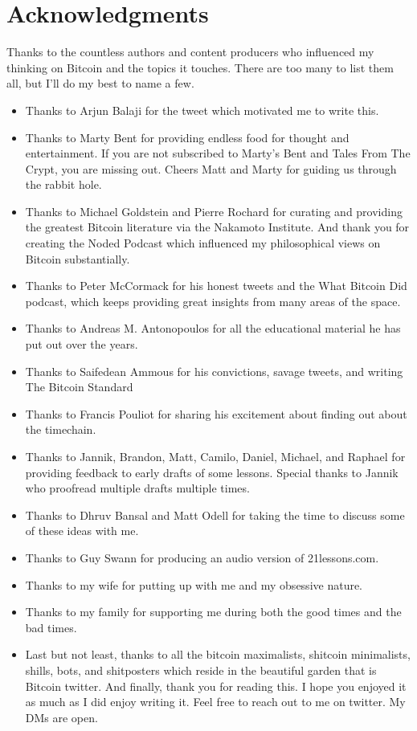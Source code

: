 \chapter*{Acknowledgments}

Thanks to the countless authors and content producers who influenced my thinking
on Bitcoin and the topics it touches. There are too many to list them all, but
I’ll do my best to name a few.

\begin{itemize}
  \item Thanks to Arjun Balaji for the tweet which motivated me to write this.
  \item Thanks to Marty Bent for providing endless food for thought and entertainment. If you are not subscribed to Marty’s Bent and Tales From The Crypt, you are missing out. Cheers Matt and Marty for guiding us through the rabbit hole.
  \item Thanks to Michael Goldstein and Pierre Rochard for curating and providing the greatest Bitcoin literature via the Nakamoto Institute. And thank you for creating the Noded Podcast which influenced my philosophical views on Bitcoin substantially.
  \item Thanks to Peter McCormack for his honest tweets and the What Bitcoin Did podcast, which keeps providing great insights from many areas of the space.
  \item Thanks to Andreas M. Antonopoulos for all the educational material he has put out over the years.
  \item Thanks to Saifedean Ammous for his convictions, savage tweets, and writing The Bitcoin Standard
  \item Thanks to Francis Pouliot for sharing his excitement about finding out about the timechain.
  \item Thanks to Jannik, Brandon, Matt, Camilo, Daniel, Michael, and Raphael for providing feedback to early drafts of some lessons. Special thanks to Jannik who proofread multiple drafts multiple times.
  \item Thanks to Dhruv Bansal and Matt Odell for taking the time to discuss some of these ideas with me.
  \item Thanks to Guy Swann for producing an audio version of 21lessons.com.
  \item Thanks to my wife for putting up with me and my obsessive nature.
  \item Thanks to my family for supporting me during both the good times and the bad times.
  \item Last but not least, thanks to all the bitcoin maximalists, shitcoin minimalists, shills, bots, and shitposters which reside in the beautiful garden that is Bitcoin twitter. And finally, thank you for reading this. I hope you enjoyed it as much as I did enjoy writing it. Feel free to reach out to me on twitter. My DMs are open.
\end{itemize}
